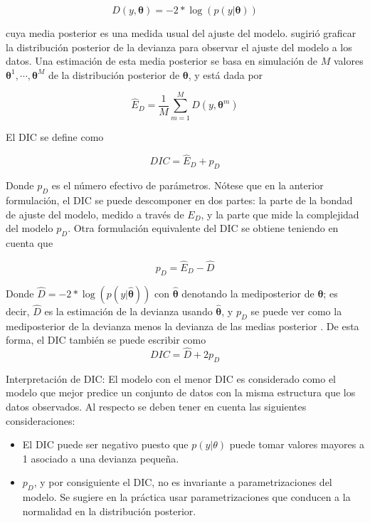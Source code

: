 \documentclass[
  10pt,
  spanish,
]{book}
\providecommand{\tightlist}{%
  \setlength{\itemsep}{0pt}\setlength{\parskip}{0pt}}
\theoremstyle{definition}
\theoremstyle{definition}
\theoremstyle{definition}
\theoremstyle{definition}
\theoremstyle{remark}
\begin{document}
\begin{equation}
D(y, \boldsymbol \theta)=-2*\log(p(y|\boldsymbol \theta))
\end{equation}

cuya media posterior es una medida usual del ajuste del modelo.
\citet{Dempster74} sugirió graficar la distribución posterior de
la devianza para observar el ajuste del modelo a los datos. Una
estimación de esta media posterior se basa en simulación de \(M\) valores
\(\boldsymbol \theta^1,\cdots,\boldsymbol \theta^M\) de la distribución posterior de \(\boldsymbol \theta\),
y está dada por

\begin{equation*}
\hat{E}_D=\frac{1}{M}\sum_{m=1}^MD(y,\boldsymbol \theta^m)
\end{equation*}

El DIC se define como

\begin{equation*}
DIC=\hat{E}_D+p_D
\end{equation*}

Donde \(p_D\) es el número efectivo de parámetros. Nótese que en la
anterior formulación, el DIC se puede descomponer en dos partes: la
parte de la bondad de ajuste del modelo, medido a través de \(E_D\), y la
parte que mide la complejidad del modelo \(p_D\). Otra formulación
equivalente del DIC se obtiene teniendo en cuenta que

\begin{equation*}
p_D=\hat{E}_D - \hat{D}
\end{equation*}

Donde \(\hat{D}=-2*\log(p(y|\hat{\boldsymbol \theta}))\) con \(\hat{\boldsymbol \theta}\)
denotando la mediposterior de \(\boldsymbol \theta\); es decir, \(\hat{D}\) es la
estimación de la devianza usando \(\hat{\boldsymbol \theta}\), y \(p_D\) se puede ver
como la mediposterior de la devianza menos la devianza de las medias
posterior \citep{Spiegel}. De esta forma, el DIC también se puede
escribir como \begin{equation*}
DIC=\hat{D}+2p_D
\end{equation*}

Interpretación de DIC: El modelo con el menor DIC es considerado como el
modelo que mejor predice un conjunto de datos con la misma estructura
que los datos observados. Al respecto se deben tener en cuenta las
siguientes consideraciones:

\begin{itemize}
\tightlist
\item
  El DIC puede ser negativo puesto que \(p(y|\theta)\) puede tomar valores
  mayores a 1 asociado a una devianza pequeña.
\item
  \(p_D\), y por consiguiente el DIC, no es invariante a parametrizaciones del
  modelo. Se sugiere en la práctica usar parametrizaciones que conducen a
  la normalidad en la distribución posterior.
\end{itemize}
\end{document}
